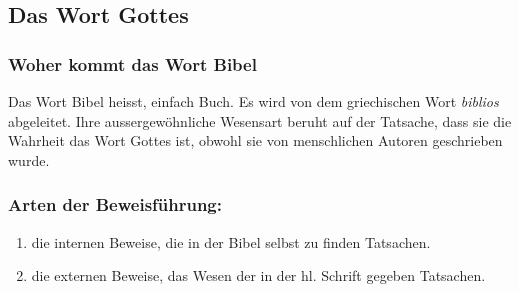 \subsection{Das Wort Gottes}
\subsubsection {Woher kommt das Wort Bibel}
Das Wort Bibel heisst, einfach Buch. Es wird von dem griechischen Wort \textit{biblios} abgeleitet. Ihre aussergewöhnliche Wesensart beruht auf der Tatsache, dass sie die Wahrheit das Wort Gottes ist, obwohl sie von menschlichen Autoren geschrieben wurde.\\

\subsubsection{Arten der Beweisführung:}
\begin{enumerate}
	\item die internen Beweise, die in der Bibel selbst zu finden Tatsachen.
	\item die externen Beweise, das Wesen der in der hl. Schrift gegeben Tatsachen.
\end{enumerate}

